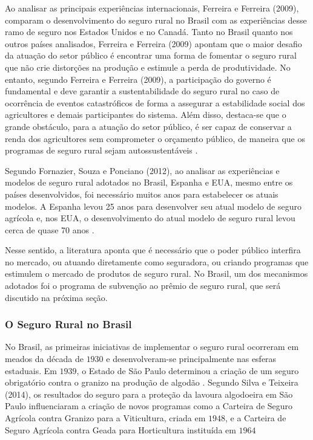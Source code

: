 \documentclass[12pt,a4paper]{article}
\begin{document}
Ao analisar as principais experiências internacionais, Ferreira e Ferreira (2009), comparam o desenvolvimento do seguro rural no Brasil com as experiências desse ramo de seguro nos Estados Unidos e no Canadá. Tanto no Brasil quanto nos outros países analisados, Ferreira e Ferreira (2009) apontam que o maior desafio da atuação do setor público é encontrar uma forma de fomentar o seguro rural que não crie distorções na produção e estimule a perda de produtividade. No entanto, segundo Ferreira e Ferreira (2009), a participação do governo é fundamental e deve garantir a sustentabilidade do seguro rural no caso de ocorrência de eventos catastróficos de forma a assegurar a estabilidade social dos agricultores e demais participantes do sistema. Além disso, destaca-se que o grande obstáculo, para a atuação do setor público, é ser capaz de conservar a renda dos agricultores sem comprometer o orçamento público, de maneira que os programas de seguro rural sejam autossustentáveis \cite{ferreira09}.  

Segundo Fornazier, Souza e Ponciano (2012), ao analisar as experiências e modelos de seguro rural adotados no Brasil, Espanha e EUA, mesmo entre os países desenvolvidos, foi necessário muitos anos para estabelecer os atuais modelos. A Espanha levou 25 anos para desenvolver seu atual modelo de seguro agrícola e, nos EUA, o desenvolvimento do atual modelo de seguro rural levou cerca de quase 70 anos \cite{ozaki06}.

Nesse sentido,  a literatura aponta que é necessário que o poder público interfira no mercado, ou atuando diretamente como seguradora, ou criando programas que estimulem o mercado de produtos de seguro rural. No Brasil, um dos mecanismos adotados foi o programa de subvenção ao prêmio de seguro rural, que será discutido na próxima seção. 
\subsubsection{O Seguro Rural no Brasil}

No Brasil, as primeiras iniciativas de implementar o seguro rural ocorreram em meados da década de $1930$ e desenvolveram-se principalmente nas esferas estaduais. Em $1939$, o Estado de São Paulo determinou a criação de um seguro obrigatório contra o granizo na produção de algodão \cite{maia11}. Segundo Silva e Teixeira (2014), os resultados do seguro para a proteção da lavoura algodoeira em São Paulo influenciaram a criação de novos programas como a Carteira de Seguro Agrícola contra Granizo para a Viticultura, criada em $1948$, e a Carteira de Seguro Agrícola contra Geada para Horticultura instituída em $1964$
\end{document}
